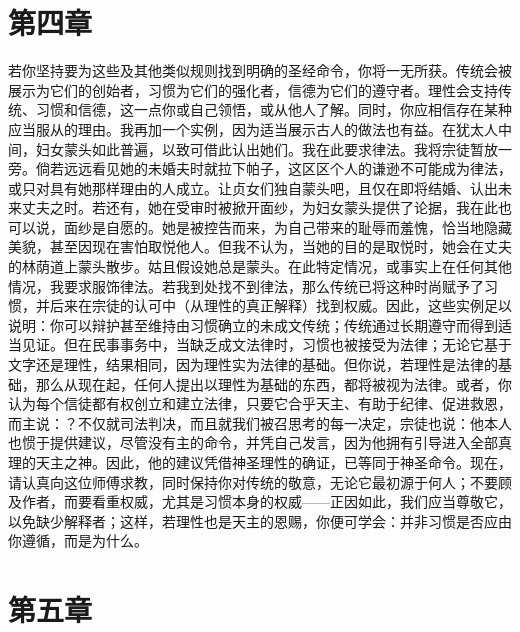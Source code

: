 
\section{第四章}

若你坚持要为这些及其他类似规则找到明确的圣经命令，你将一无所获。传统会被展示为它们的创始者，习惯为它们的强化者，信德为它们的遵守者。理性会支持传统、习惯和信德，这一点你或自己领悟，或从他人了解。同时，你应相信存在某种应当服从的理由。我再加一个实例，因为适当展示古人的做法也有益。在犹太人中间，妇女蒙头如此普遍，以致可借此认出她们。我在此要求律法。我将宗徒暂放一旁。倘若远远看见她的未婚夫时就拉下帕子，这区区个人的谦逊不可能成为律法，或只对具有她那样理由的人成立。让贞女们独自蒙头吧，且仅在即将结婚、认出未来丈夫之时。若还有，她在受审时被掀开面纱，为妇女蒙头提供了论据，我在此也可以说，面纱是自愿的。她是被控告而来，为自己带来的耻辱而羞愧，恰当地隐藏美貌，甚至因现在害怕取悦他人。但我不认为，当她的目的是取悦时，她会在丈夫的林荫道上蒙头散步。姑且假设她总是蒙头。在此特定情况，或事实上在任何其他情况，我要求服饰律法。若我到处找不到律法，那么传统已将这种时尚赋予了习惯，并后来在宗徒的认可中（从理性的真正解释）找到权威。因此，这些实例足以说明：你可以辩护甚至维持由习惯确立的未成文传统；传统通过长期遵守而得到适当见证。但在民事事务中，当缺乏成文法律时，习惯也被接受为法律；无论它基于文字还是理性，结果相同，因为理性实为法律的基础。但你说，若理性是法律的基础，那么从现在起，任何人提出以理性为基础的东西，都将被视为法律。或者，你认为每个信徒都有权创立和建立法律，只要它合乎天主、有助于纪律、促进救恩，而主说：？不仅就司法判决，而且就我们被召思考的每一决定，宗徒也说：他本人也惯于提供建议，尽管没有主的命令，并凭自己发言，因为他拥有引导进入全部真理的天主之神。因此，他的建议凭借神圣理性的确证，已等同于神圣命令。现在，请认真向这位师傅求教，同时保持你对传统的敬意，无论它最初源于何人；不要顾及作者，而要看重权威，尤其是习惯本身的权威——正因如此，我们应当尊敬它，以免缺少解释者；这样，若理性也是天主的恩赐，你便可学会：并非习惯是否应由你遵循，而是为什么。\par


\section{第五章}

